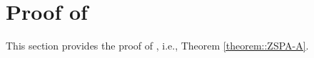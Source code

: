 






\section{Proof of \zspaa}\label{sec::proof-of-zspaa}

This section provides the proof of \zspaa, i.e., Theorem \ref{theorem::ZSPA-A}. 


